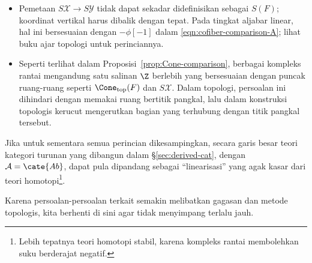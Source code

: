 \begin{itemize}
	\item Pemetaan $S\mathcal{X}\to S\mathcal{Y}$ tidak dapat sekadar
	didefinisikan sebagai $S(F)$; koordinat vertikal harus dibalik dengan tepat.
	Pada tingkat aljabar linear, hal ini bersesuaian dengan
	$-\phi[-1]$ dalam \eqref{eqn:cofiber-comparison-A}; lihat buku ajar
	topologi untuk perinciannya.
	\item Seperti terlihat dalam Proposisi~\ref{prop:Cone-comparison},
	berbagai kompleks rantai mengandung satu salinan $\Z$ berlebih yang
	bersesuaian dengan puncak ruang-ruang seperti
	$\Cone_{\mathrm{top}}(F)$ dan $S\mathcal{X}$. Dalam topologi, persoalan
	ini dihindari dengan memakai ruang bertitik pangkal, lalu dalam
	konstruksi topologis kerucut mengerutkan bagian yang terhubung dengan
	titik pangkal tersebut.
\end{itemize}

Jika untuk sementara semua perincian dikesampingkan, secara garis besar
teori kategori turunan yang dibangun dalam \S\ref{sec:derived-cat}, dengan
$\mathcal{A}=\cate{Ab}$, dapat pula dipandang sebagai ``linearisasi'' yang
agak kasar dari teori homotopi\footnote{Lebih tepatnya teori homotopi
stabil, karena kompleks rantai membolehkan suku berderajat negatif.}.

Karena persoalan-persoalan terkait semakin melibatkan gagasan dan metode
topologis, kita berhenti di sini agar tidak menyimpang terlalu jauh.
